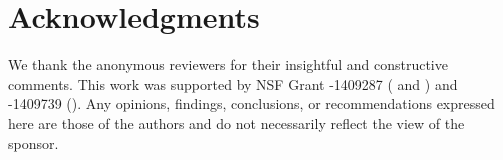\documentclass[sigconf]{acmart}
\newcommand{\latexfile}[1]{}
\begin{document}
\latexfile{10-introduction}
\latexfile{20-background}
\latexfile{30-method}
\latexfile{40-results}
\latexfile{50-discussion}
\latexfile{60-conclusion}

\section{Acknowledgments}
We thank the anonymous reviewers for their insightful and constructive
comments. This work was supported by NSF Grant -1409287 ( and ) and -1409739 ().
Any opinions, findings,
conclusions, or recommendations expressed here are those of the
authors and do not necessarily reflect the view of the sponsor.

\clearpage



\end{document}
